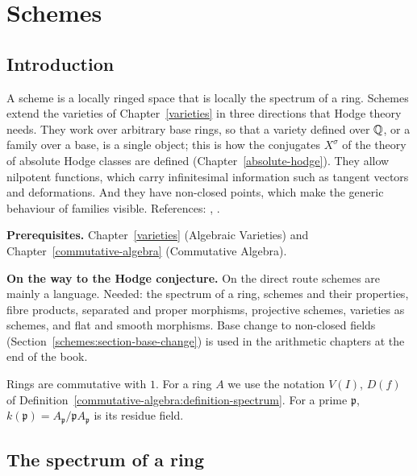 \chapter{Schemes}\label{schemes}

\section{Introduction}\label{schemes:section-introduction}

A scheme is a locally ringed space that is locally the spectrum of a ring. Schemes extend the varieties of Chapter~\ref{varieties} in three
directions that Hodge theory needs. They work over arbitrary base rings, so that a variety defined over $\mathbb{Q}$, or a family over a base, is a single
object; this is how the conjugates $X^\sigma$ of the theory of absolute Hodge classes are defined (Chapter~\ref{absolute-hodge}). They allow nilpotent
functions, which carry infinitesimal information such as tangent vectors and deformations. And they have non-closed points, which make the
generic behaviour of families visible. References: \cite[Chapter II]{hartshorne-ag}, \cite{stacks-project}.

\noindent\textbf{Prerequisites.} Chapter~\ref{varieties} (Algebraic Varieties) and Chapter~\ref{commutative-algebra} (Commutative Algebra).

\noindent\textbf{On the way to the Hodge conjecture.} On the direct route schemes are mainly a language. Needed: the spectrum of a ring, schemes and their properties, fibre products, separated and
proper morphisms, projective schemes, varieties as schemes, and flat and smooth morphisms. Base change to non-closed fields (Section~\ref{schemes:section-base-change}) is used in the arithmetic
chapters at the end of the book.

Rings are commutative with $1$. For a ring $A$ we use the notation $V(I)$, $D(f)$ of Definition~\ref{commutative-algebra:definition-spectrum}.
For a prime $\mathfrak{p}$, $k(\mathfrak{p}) = A_\mathfrak{p}/\mathfrak{p}A_\mathfrak{p}$ is its residue field.

\section{The spectrum of a ring}\label{schemes:section-spectrum}


